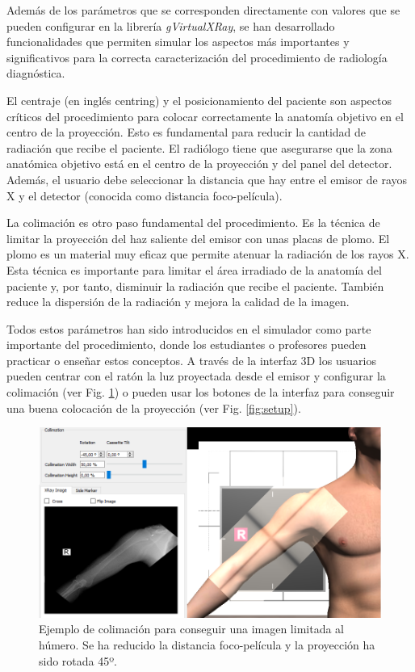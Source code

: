 Además de los parámetros que se corresponden directamente con valores que se pueden configurar en la librería \emph{gVirtualXRay}, se han desarrollado funcionalidades que permiten simular los aspectos más importantes y significativos para la correcta caracterización del procedimiento de radiología diagnóstica. 

El centraje (en inglés centring) y el posicionamiento del paciente son aspectos críticos del procedimiento para colocar correctamente la anatomía objetivo en el centro de la proyección. Esto es fundamental para reducir la cantidad de radiación que recibe el paciente. El radiólogo tiene que asegurarse que la zona anatómica objetivo está en el centro de la proyección y del panel del detector. Además, el usuario debe seleccionar la distancia que hay entre el emisor de rayos X y el detector (conocida como distancia foco-película).

La colimación es otro paso fundamental del procedimiento. Es la técnica de limitar la proyección del haz saliente del emisor con unas placas de plomo. El plomo es un material muy eficaz que permite atenuar la radiación de los rayos X. Esta técnica es importante para limitar el área irradiado de la anatomía del paciente y, por tanto,  disminuir la radiación que recibe el paciente. También reduce la dispersión de la radiación y mejora la calidad de la imagen.

Todos estos parámetros han sido introducidos en el simulador como parte importante del procedimiento, donde los estudiantes o profesores pueden practicar o enseñar estos conceptos. A través de la interfaz 3D los usuarios pueden centrar con el ratón la luz proyectada desde el emisor y configurar la colimación (ver Fig. \ref{fig:collimation}) o pueden usar los botones de la interfaz para conseguir una buena colocación de la proyección (ver Fig. \ref{fig:setup}).

\begin{figure}[tb]
\centering
\includegraphics[width=0.9\linewidth]{IMG/collimation.png}
\caption{\label{fig:collimation} Ejemplo de colimación para conseguir una imagen limitada al húmero. Se ha reducido la distancia foco-película y la proyección ha sido rotada  45º. }
\end{figure}

